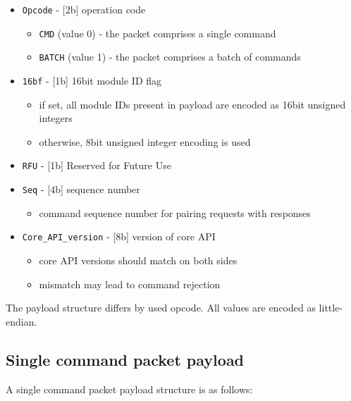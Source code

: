 \begin{itemize}
	\item \texttt{Opcode} - [2b] operation code
		\begin{itemize}
			\item \texttt{CMD} (value 0) - the packet comprises a single command
			\item \texttt{BATCH} (value 1) - the packet comprises a batch of commands
		\end{itemize}
	\item \texttt{16bf} - [1b] 16bit module ID flag
		\begin{itemize}
			\item if set, all module IDs present in payload are encoded as 16bit unsigned integers
			\item otherwise, 8bit unsigned integer encoding is used
		\end{itemize}
	\item \texttt{RFU} - [1b] Reserved for Future Use
	\item \texttt{Seq} - [4b] sequence number
		\begin{itemize}
			\item command sequence number for pairing requests with responses
		\end{itemize}
	\item \texttt{Core\_API\_version} - [8b] version of core API
		\begin{itemize}
			\item core API versions should match on both sides
			\item mismatch may lead to command rejection
		\end{itemize}
\end{itemize}

The payload structure differs by used opcode. All values are encoded as little-endian.

\subsection{Single command packet payload}

A single command packet payload structure is as follows:

